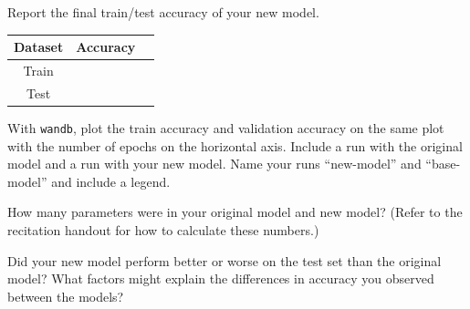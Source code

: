 \documentclass[11pt,addpoints,answers]{exam}
\begin{document}
\begin{questions}
\begin{parts}
\clearpage

\begin{subparts}

    \subpart[1] Report the final train/test accuracy of your new model.

        \begin{answer_box}[title=,height=3cm, width=10cm]
        \begin{center}
            \begin{tabular}{ccc}
                \toprule
                Dataset  & Accuracy \\
                \midrule
                Train  & \\
                Test  & \\
                \bottomrule
            \end{tabular}
        \end{center}
        \end{answer_box}
        
    \subpart[4] With \lstinline{wandb}, plot the train accuracy and validation accuracy on the same plot with the number of epochs on the horizontal axis. Include a run with the original model and a run with your new model. Name your runs ``new-model'' and ``base-model'' and include a legend. 
        
        \begin{answer_box}[title=,height=8cm, width=15cm]
        \end{answer_box}


    \subpart[2] How many parameters were in your original model and new model? (Refer to the recitation handout for how to calculate these numbers.)

        \begin{answer_box}[title=Original model,height=2cm, width=4cm]
        \end{answer_box}
        
        \begin{answer_box}[title=New model,height=2cm, width=4cm]
        \end{answer_box}

\clearpage

    \subpart[2] Did your new model perform better or worse on the test set than the original model? What factors might explain the differences in accuracy you observed between the models?

        \begin{answer_box}[title=,height=8cm, width=15cm]
        \end{answer_box}


\end{subparts}
\end{parts}
\end{questions}
\end{document}
